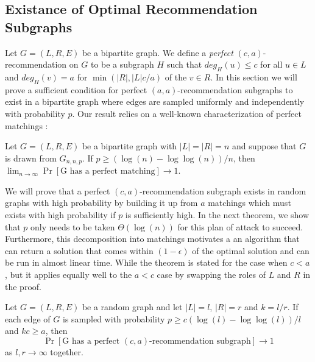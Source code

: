 \subsection{Existance of Optimal Recommendation Subgraphs}
Let $G=(L,R,E)$ be a bipartite graph. We define a \emph{perfect} $(c,a)$-recommendation on $G$ to be a subgraph $H$ such that $deg_H(u)\leq c$ for all $u\in L$ and $deg_H(v)=a$ for $\min(|R|,|L|c/a)$ of the $v\in R$. In this section we will prove a sufficient condition for perfect $(a,a)$-recommendation subgraphs to exist in a bipartite graph where edges are sampled uniformly and independently with probability $p$. Our result relies on a well-known characterization of perfect matchings \cite{Janson2011}:

\label{random_matching_threshold}
\begin{thm}
Let $G=(L,R,E)$ be a bipartite graph with $|L| = |R| = n$ and suppose that $G$ is drawn from $G_{n,n,p}$. If $p \geq (\log(n) - \log\log(n))/n$, then $\lim_{n\to\infty}\Pr[\text{G has a perfect matching}] \to 1$.
\end{thm}

We will prove that a perfect $(c,a)$-recommendation subgraph exists in random graphs with high probability by building it up from $a$ matchings which must exists with high probability if $p$ is sufficiently high. In the next theorem, we show that $p$ only needs to be taken $\Theta(\log(n))$ for this plan of attack to succeed. Furthermore, this decomposition into matchings motivates a an algorithm that can return a solution that comes within $(1-\epsilon)$ of the optimal solution and can be run in almost linear time. While the theorem is stated for the case when $c<a$, but it applies equally well to the $a<c$ case by swapping the roles of $L$ and $R$ in the proof.

\begin{thm}
Let $G=(L,R,E)$ be a random graph and let $|L|=l$, $|R|=r$ and $k=l/r$. If each edge of $G$ is sampled with probability $p\geq c(\log(l)-\log\log(l))/l$ and $kc \geq a$, then 
\[ \Pr[\text{G has a perfect $(c,a)$-recommendation subgraph}] \to 1\]
as $l,r\to\infty$ together.
\end{thm}

